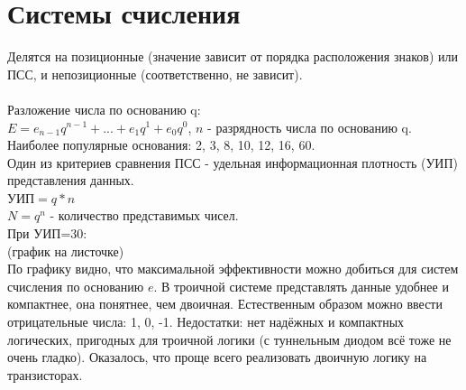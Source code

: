 \documentclass[a4paper,12pt]{report}
\begin{document}
\section{Системы счисления}
Делятся на позиционные (значение зависит от порядка расположения знаков) или ПСС,  и непозиционные (соответственно, не зависит).\\
\\
Разложение числа по основанию q:\\
$E=e_{n-1}q^{n-1}+...+e_1q^1+e_0q^0$, $n$ - разрядность числа по основанию q.\\
Наиболее популярные основания: 2, 3, 8, 10, 12, 16, 60.\\
Один из критериев сравнения ПСС - удельная информационная плотность (УИП) представления данных.\\
УИП$=q*n$\\
$N=q^n$ - количество представимых чисел.\\
При УИП=30:\\
(график на листочке)\\
По графику видно, что максимальной эффективности можно добиться для систем счисления по основанию $e$. В троичной системе представлять данные удобнее и компактнее, она понятнее, чем двоичная. Естественным образом можно ввести отрицательные числа: 1, 0, -1. Недостатки: нет надёжных и компактных логических, пригодных для троичной логики (с туннельным диодом всё тоже не очень гладко). Оказалось, что проще всего реализовать двоичную логику на транзисторах.\\
\end{document}
